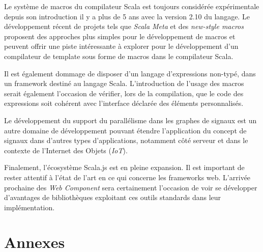 \documentclass[11pt, a4paper, twoside, frenchb]{book}
\begin{document}
Le système de macros du compilateur Scala est toujours considérée expérimentale depuis son introduction il y a plus de 5 ans avec la version 2.10 du langage. Le développement récent de projets tels que \emph{Scala Meta} \cite{scalameta} et des \emph{new-style macros} proposent des approches plus simples pour le développement de macros et peuvent offrir une piste intéressante à explorer pour le développement d'un compilateur de template sous forme de macros dans le compilateur Scala.

Il est également dommage de disposer d'un langage d'expressions non-typé, dans un framework destiné au langage Scala. L'introduction de l'usage des macros serait également l'occasion de vérifier, lors de la compilation, que le code des expressions soit cohérent avec l'interface déclarée des éléments personnalisés.

Le développement du support du parallélisme dans les graphes de signaux est un autre domaine de développement pouvant étendre l'application du concept de signaux dans d'autres types d'applications, notamment côté serveur et dans le contexte de l'Internet des Objets (\emph{IoT}).

Finalement, l'écosystème Scala.js est en pleine expansion. Il est important de rester attentif à l'état de l'art en ce qui concerne les frameworks web. L'arrivée prochaine des \emph{Web Component} sera certainement l'occasion de voir se développer d'avantages de bibliothèques exploitant ces outils standards dans leur implémentation.

\backmatter
\part{Annexes}



\end{document}

